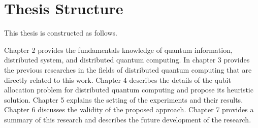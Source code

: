 \section{Thesis Structure}
\label{introduction:thesis_structure}
This thesis is constructed as follows.

Chapter 2 provides the fundamentals knowledge of quantum information, distributed system, and distributed quantum computing.
In chapter 3 provides the previous researches in the fields of distributed quantum computing that are directly related to this work.
Chapter 4 describes the details of the qubit allocation problem for distributed quantum computing and propose its heuristic solution.
Chapter 5 explains the setting of the experiments and their results.
Chapter 6 discusses the validity of the proposed approach.
Chapter 7 provides a summary of this research and describes the future development of the research.


